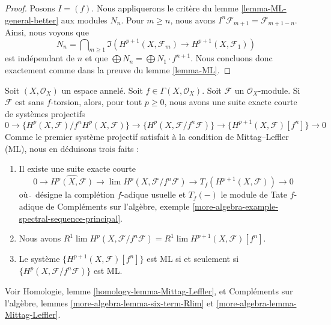 {\begin{proof}
Posons $I = (f)$. Nous appliquerons le critère du lemme \ref{lemma-ML-general-better} aux modules $N_n$. Pour $m \geq n$, nous avons
$I^n\mathcal{F}_{m + 1} = \mathcal{F}_{m + 1 - n}$. Ainsi, nous voyons que
$$
N_n = \bigcap\nolimits_{m \geq 1} \Im\left(
H^{p + 1}(X, \mathcal{F}_m) \to H^{p + 1}(X, \mathcal{F}_1)
\right)
$$
est indépendant de $n$ et que $\bigoplus N_n = \bigoplus N_1 \cdot f^{n + 1}$. Nous concluons donc exactement comme dans la preuve du lemme \ref{lemma-ML}.
\end{proof}

\begin{remark}

\label{remark-compare-ML}

Soit $(X, \mathcal{O}_X)$ un espace annelé. Soit $f \in \Gamma(X, \mathcal{O}_X)$. Soit $\mathcal{F}$ un $\mathcal{O}_X$-module. Si $\mathcal{F}$ est sans $f$-torsion, alors, pour tout $p \geq 0$, nous avons une suite exacte courte de systèmes projectifs
$$
0 \to \{H^p(X, \mathcal{F})/f^nH^p(X, \mathcal{F})\}
\to \{H^p(X, \mathcal{F}/f^n\mathcal{F})\}
\to \{H^{p + 1}(X, \mathcal{F})[f^n]\} \to 0
$$
Comme le premier système projectif satisfait à la condition de Mittag--Leffler (ML), nous en déduisons trois faits :

\begin{enumerate}

\item Il existe une suite exacte courte
$$
0 \to \widehat{H^p(X, \mathcal{F})} \to
\lim H^p(X, \mathcal{F}/f^n\mathcal{F}) \to
T_f(H^{p + 1}(X, \mathcal{F})) \to 0
$$
où $\widehat{\ }$ désigne la complétion $f$-adique usuelle et
$T_f( - )$ le module de Tate $f$-adique de Compléments sur l'algèbre, exemple
\ref{more-algebra-example-spectral-sequence-principal}.
\item Nous avons
$R^1\lim H^p(X, \mathcal{F}/f^n\mathcal{F}) =
R^1\lim H^{p + 1}(X, \mathcal{F})[f^n]$.
\item Le système $\{H^{p + 1}(X, \mathcal{F})[f^n]\}$ est ML si et seulement si
$\{H^p(X, \mathcal{F}/f^n\mathcal{F})\}$ est ML.

\end{enumerate}

Voir Homologie, lemme \ref{homology-lemma-Mittag-Leffler}, et Compléments sur l'algèbre, lemmes \ref{more-algebra-lemma-six-term-Rlim} et
\ref{more-algebra-lemma-Mittag-Leffler}.

\end{remark}









}
